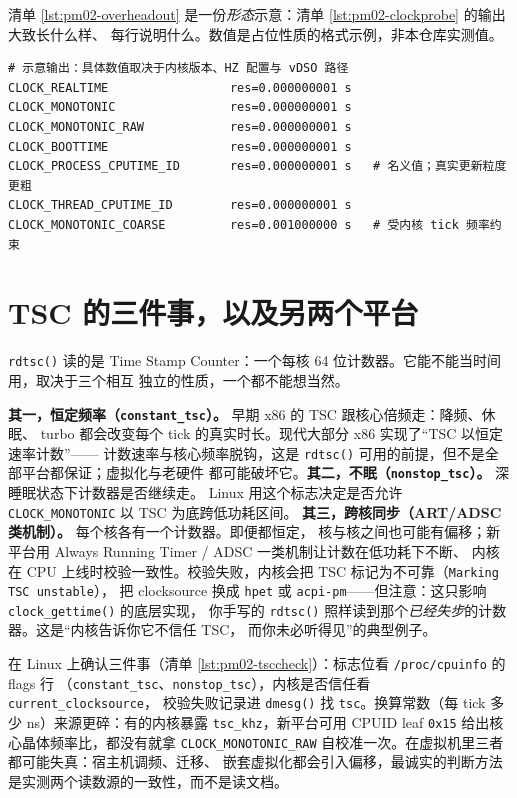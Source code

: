 \documentclass[12pt,a4paper,fontset=fandol]{ctexbook}
\newcommand{\Fn}[1]{\texttt{#1()}}
\newcommand{\Tp}[1]{\texttt{#1}}
\newcommand{\Bk}{\discretionary{}{}{}}
\begin{document}
清单 \ref{lst:pm02-overheadout} 是一份\emph{形态}示意：清单 \ref{lst:pm02-clockprobe} 的输出大致长什么样、
每行说明什么。数值是占位性质的格式示例，非本仓库实测值。

\begin{lstlisting}[style=outstyle, title={格式示例（非本仓库实测值）：clock id 探针的示意输出}, label={lst:pm02-overheadout}]
# 示意输出：具体数值取决于内核版本、HZ 配置与 vDSO 路径
CLOCK_REALTIME                 res=0.000000001 s
CLOCK_MONOTONIC                res=0.000000001 s
CLOCK_MONOTONIC_RAW            res=0.000000001 s
CLOCK_BOOTTIME                 res=0.000000001 s
CLOCK_PROCESS_CPUTIME_ID       res=0.000000001 s   # 名义值；真实更新粒度更粗
CLOCK_THREAD_CPUTIME_ID        res=0.000000001 s
CLOCK_MONOTONIC_COARSE         res=0.001000000 s   # 受内核 tick 频率约束
\end{lstlisting}

\section{TSC 的三件事，以及另两个平台}
\label{sec:pm02-tsc}

\Fn{rdtsc} 读的是 Time Stamp Counter：一个每核 64 位计数器。它能不能当时间用，取决于三个相互
独立的性质，一个都不能想当然。

\textbf{其一，恒定频率（\Tp{constant{\Bk}\_tsc}）。} 早期 x86 的 TSC 跟核心倍频走：降频、休眠、
turbo 都会改变每个 tick 的真实时长。现代大部分 x86 实现了``TSC 以恒定速率计数''——
计数速率与核心频率脱钩，这是 \Fn{rdtsc} 可用的前提，但不是全部平台都保证；虚拟化与老硬件
都可能破坏它。\textbf{其二，不眠（\Tp{nonstop{\Bk}\_tsc}）。} 深睡眠状态下计数器是否继续走。
Linux 用这个标志决定是否允许 \Tp{CLOCK{\Bk}\_MONOTONIC} 以 TSC 为底跨低功耗区间。
\textbf{其三，跨核同步（ART/ADSC 类机制）。} 每个核各有一个计数器。即便都恒定，
核与核之间也可能有偏移；新平台用 Always Running Timer / ADSC 一类机制让计数在低功耗下不断、
内核在 CPU 上线时校验一致性。校验失败，内核会把 TSC 标记为不可靠（\Tp{Marking TSC unstable}），
把 clocksource 换成 \Tp{hpet} 或 \Tp{acpi{\Bk}-pm}——但注意：这只影响 \Fn{clock{\Bk}\_gettime} 的底层实现，
你手写的 \Fn{rdtsc} 照样读到那个\emph{已经失步}的计数器。这是``内核告诉你它不信任 TSC，
而你未必听得见''的典型例子。

在 Linux 上确认三件事（清单 \ref{lst:pm02-tsccheck}）：标志位看 \Tp{/proc{\Bk}/cpuinfo} 的 flags 行
（\Tp{constant{\Bk}\_tsc}、\Tp{nonstop{\Bk}\_tsc}），内核是否信任看 \Tp{current{\Bk}\_clocksource}，
校验失败记录进 \Fn{dmesg} 找 \Tp{tsc}。换算常数（每 tick 多少 ns）来源更碎：有的内核暴露
\Tp{tsc{\Bk}\_khz}，新平台可用 CPUID leaf \Tp{0x15} 给出核心晶体频率比，都没有就拿
\Tp{CLOCK{\Bk}\_MONOTONIC{\Bk}\_RAW} 自校准一次。在虚拟机里三者都可能失真：宿主机调频、迁移、
嵌套虚拟化都会引入偏移，最诚实的判断方法是实测两个读数源的一致性，而不是读文档。
\end{document}
